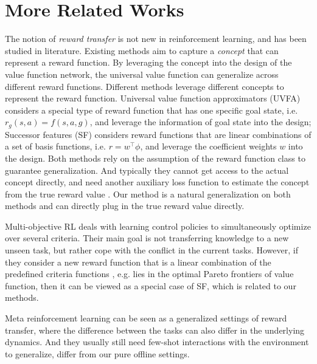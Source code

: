 \clearpage
\section{More Related Works}
The notion of \textit{reward transfer} is not new in reinforcement learning, and has been studied in literature.
Existing methods aim to capture a \textit{concept} that can represent a reward function.
By leveraging the concept into the design of the value function network, the universal value function can generalize across different reward functions.
Different methods leverage different concepts to represent the reward function.
Universal value function approximators (UVFA) \citep{schaul2015universal} considers a special type of reward function that has one specific goal state, i.e. $r_g(s,a) = f(s,a, g)$,
and leverage the information of goal state into the design;
Successor features (SF) \citep{barreto2017successor,barreto2018transfer,borsa2018universal, barreto2020fast} considers reward functions that are linear combinations of a set of basis functions, i.e. $r = w^\top \phi$,
and leverage the coefficient weights $w$ into the design.
Both methods rely on the assumption of the reward function class to guarantee generalization.
And typically they cannot get access to the actual concept directly, 
and need another auxiliary loss function to estimate the concept from the true reward value \citep{kulkarni2016deep}.
Our method is a natural generalization on both methods and can directly plug in the true reward value directly.

Multi-objective RL \citep[e.g.][]{roijers2013survey,van2014multi, li2019multi, yu2020gradient} 
deals with learning control policies to simultaneously optimize over several criteria.
Their main goal is not transferring knowledge to a new unseen task, but rather cope with the conflict in the current tasks.
However, if they consider a new reward function that is a linear combination of the predefined criteria functions \citep{yang2019generalized}, e.g. lies in the optimal Pareto frontiers of value function, then it can be viewed as a special case of SF, which is related to our methods.

Meta reinforcement learning \citep[e.g.,][]{duan2016rl, finn2017model, nichol2018first, xu2018meta, rakelly2019efficient, Zintgraf2020VariBAD} can be seen as a generalized settings of reward transfer, where the difference between the tasks can also differ in the underlying dynamics. 
And they usually still need few-shot interactions with the environment to generalize, differ from our pure offline settings.

